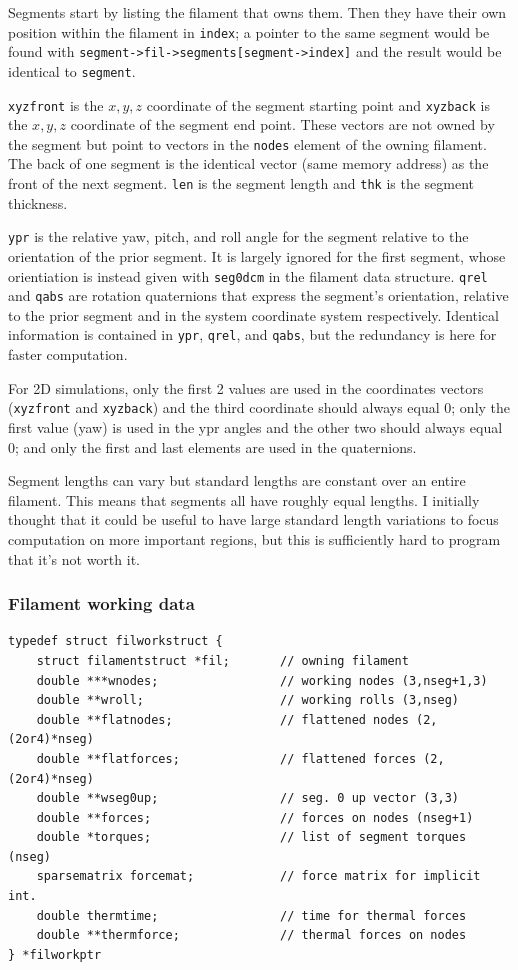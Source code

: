 \documentclass {scrbook}
\newcommand {\ttt} {\texttt}
\begin{document}
Segments start by listing the filament that owns them. Then they have their own position within the filament in \ttt{index}; a pointer to the same segment would be found with \ttt{segment->fil->segments[segment->index]} and the result would be identical to \ttt{segment}.

\ttt{xyzfront} is the $x, y, z$ coordinate of the segment starting point and \ttt{xyzback} is the $x, y, z$ coordinate of the segment end point. These vectors are not owned by the segment but point to vectors in the \ttt{nodes} element of the owning filament. The back of one segment is the identical vector (same memory address) as the front of the next segment. \ttt{len} is the segment length and \ttt{thk} is the segment thickness.

\ttt{ypr} is the relative yaw, pitch, and roll angle for the segment relative to the orientation of the prior segment. It is largely ignored for the first segment, whose orientiation is instead given with \ttt{seg0dcm} in the filament data structure. \ttt{qrel} and \ttt{qabs} are rotation quaternions that express the segment's orientation, relative to the prior segment and in the system coordinate system respectively. Identical information is contained in \ttt{ypr}, \ttt{qrel}, and \ttt{qabs}, but the redundancy is here for faster computation.

For 2D simulations, only the first 2 values are used in the coordinates vectors (\ttt{xyzfront} and \ttt{xyzback}) and the third coordinate should always equal 0; only the first value (yaw) is used in the ypr angles and the other two should always equal 0; and only the first and last elements are used in the quaternions.

Segment lengths can vary but standard lengths are constant over an entire filament. This means that segments all have roughly equal lengths. I initially thought that it could be useful to have large standard length variations to focus computation on more important regions, but this is sufficiently hard to program that it's not worth it.

\subsubsection{Filament working data}

\begin{lstlisting}
typedef struct filworkstruct {
    struct filamentstruct *fil;       // owning filament
    double ***wnodes;                 // working nodes (3,nseg+1,3)
    double **wroll;                   // working rolls (3,nseg)
    double **flatnodes;               // flattened nodes (2,(2or4)*nseg)
    double **flatforces;              // flattened forces (2,(2or4)*nseg)
    double **wseg0up;                 // seg. 0 up vector (3,3)
    double **forces;                  // forces on nodes (nseg+1)
    double *torques;                  // list of segment torques (nseg)
    sparsematrix forcemat;            // force matrix for implicit int.
    double thermtime;                 // time for thermal forces
    double **thermforce;              // thermal forces on nodes
} *filworkptr
\end{lstlisting}
\end{document}

